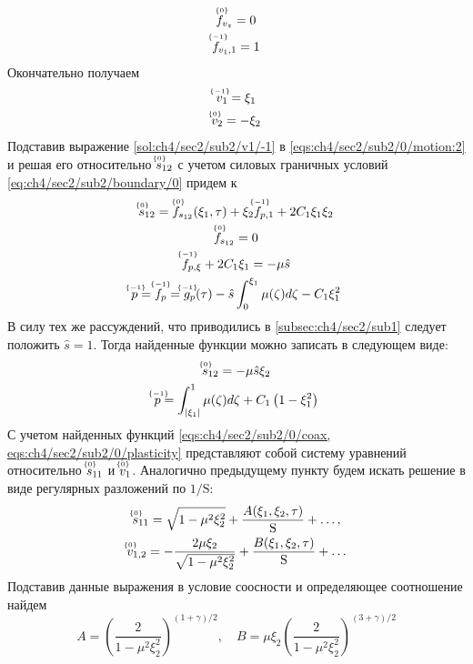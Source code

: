 \begin{gather*}
  \uindex{f}{0}_{v_{z}} = 0
  \\
  \uindex{f}{-1}_{v_{1},1} = 1
\end{gather*}
Окончательно получаем
\begin{gather}
  \label{sol:ch4/sec2/sub2/v1/-1}
  \uindex{v}{-1}_{1} = \xi_1
  \\
  \label{sol:ch4/sec2/sub2/v2/0}
  \uindex{v}{0}_{2} =  -\xi_2
\end{gather}
Подставив выражение \cref{sol:ch4/sec2/sub2/v1/-1} в \cref{eqs:ch4/sec2/sub2/0/motion:2} и решая его относительно $\uindex{s}{0}_{12}$ с учетом силовых граничных условий \cref{eq:ch4/sec2/sub2/boundary/0} придем к
\begin{gather*}
  \uindex{s}{0}_{12} = \uindex{f}{0}_{s_{12}}(\xi_1, \tau) + \xi_2  \uindex{f}{-1}_{p,1} + 2 C_1 \xi_1 \xi_2
  \\
  \uindex{f}{0}_{s_{12}} = 0
  \\
  \uindex{f}{-1}_{p,\xi} + 2 C_1 \xi_1 = -\mu \hat{s}
  \\
  \uindex{p}{-1}=\uindex{f}{-1}_{p} =\uindex{g}{-1}_{p}(\tau) -\hat{s}\int_0^{\xi_1}{\mu(\zeta)d\zeta} - C_1 \xi_1^2
\end{gather*}
В силу тех же рассуждений, что приводились в \ref{subsec:ch4/sec2/sub1} следует положить $\hat{s} = 1$. Тогда найденные функции можно записать в следующем виде:
\begin{gather}
  \label{sol:ch4/sec2/sub2/s12/0}
  \uindex{s}{0}_{12} = -\mu \hat{s} \xi_2
  \\
  \label{sol:ch4/sec2/sub2/p/-1}
  \uindex{p}{-1} = \int_{\vert\xi_1\vert}^1{\mu(\zeta)d\zeta} + C_1 \left(1-\xi_1^2\right)
\end{gather}
С учетом найденных функций \cref{eqs:ch4/sec2/sub2/0/coax, eqs:ch4/sec2/sub2/0/plasticity} представляют собой систему уравнений относительно $\uindex{s}{0}_{11}$ и $\uindex{v}{0}_{1}$.
Аналогично предыдущему пункту будем искать решение в виде регулярных разложений по $1/\text{S}$:
\begin{gather}
  \uindex{s}{0}_{11} = \sqrt{1-\mu^2\xi_2^2} + \frac{A(\xi_1,\xi_2,\tau)}{\text{S}} + \ldots, \\
  \uindex{v}{0}_{1,2} = -\frac{2\mu \xi_2}{\sqrt{1-\mu^2\xi_2^2}} + \frac{B(\xi_1,\xi_2,\tau)}{\text{S}} + \ldots
\end{gather}
Подставив данные выражения в условие соосности и определяющее соотношение найдем
\begin{equation}
  A=\left(\frac{2}{1-\mu^2\xi_2^2}\right)^{(1+\gamma)/2}, \quad B = \mu \xi_2 \left(\frac{2}{1-\mu^2\xi_2^2}\right)^{(3+\gamma)/2}
\end{equation}
